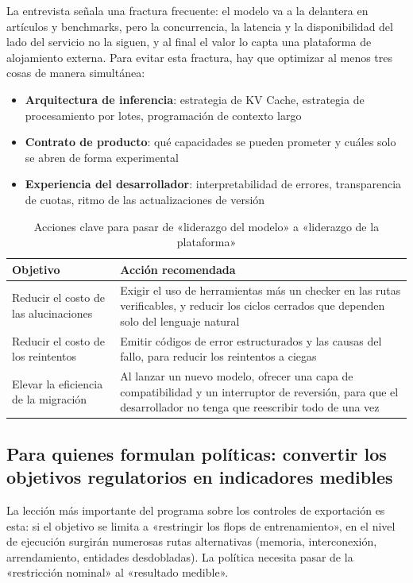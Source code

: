 La entrevista señala una fractura frecuente: el modelo va a la delantera en artículos y benchmarks, pero la concurrencia, la latencia y la disponibilidad del lado del servicio no la siguen, y al final el valor lo capta una plataforma de alojamiento externa. Para evitar esta fractura, hay que optimizar al menos tres cosas de manera simultánea:
\begin{itemize}
    \item \textbf{Arquitectura de inferencia}: estrategia de KV Cache, estrategia de procesamiento por lotes, programación de contexto largo
    \item \textbf{Contrato de producto}: qué capacidades se pueden prometer y cuáles solo se abren de forma experimental
    \item \textbf{Experiencia del desarrollador}: interpretabilidad de errores, transparencia de cuotas, ritmo de las actualizaciones de versión
\end{itemize}

\begin{table}[H]
\centering
\begin{tabular}{lp{8.5cm}}
\toprule
\textbf{Objetivo} & \textbf{Acción recomendada} \\
\midrule
Reducir el costo de las alucinaciones & Exigir el uso de herramientas más un checker en las rutas verificables, y reducir los ciclos cerrados que dependen solo del lenguaje natural \\
Reducir el costo de los reintentos & Emitir códigos de error estructurados y las causas del fallo, para reducir los reintentos a ciegas \\
Elevar la eficiencia de la migración & Al lanzar un nuevo modelo, ofrecer una capa de compatibilidad y un interruptor de reversión, para que el desarrollador no tenga que reescribir todo de una vez \\
\bottomrule
\end{tabular}
\caption{Acciones clave para pasar de «liderazgo del modelo» a «liderazgo de la plataforma»}
\end{table}

\subsection{Para quienes formulan políticas: convertir los objetivos regulatorios en indicadores medibles}

La lección más importante del programa sobre los controles de exportación es esta: si el objetivo se limita a «restringir los flops de entrenamiento», en el nivel de ejecución surgirán numerosas rutas alternativas (memoria, interconexión, arrendamiento, entidades desdobladas). La política necesita pasar de la «restricción nominal» al «resultado medible».


